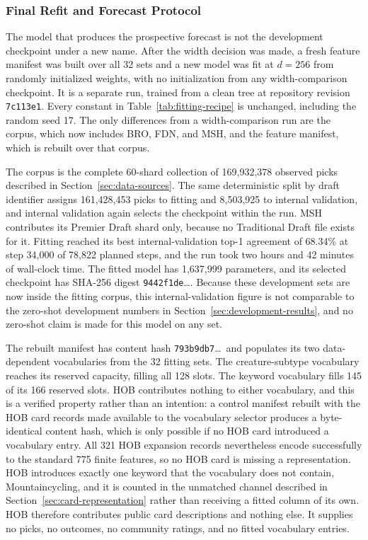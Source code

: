 \documentclass[11pt]{article}
\numberwithin{equation}{section}
\begin{document}
\subsubsection{Final Refit and Forecast Protocol}
\label{sec:final-refit-protocol}

The model that produces the prospective forecast is not the development
checkpoint under a new name. After the width decision was made, a fresh feature
manifest was built over all 32 sets and a new model was fit at $d=256$ from
randomly initialized weights, with no initialization from any width-comparison
checkpoint. It is a separate run, trained from a clean tree at
repository revision \texttt{7c113e1}. Every constant in
Table~\ref{tab:fitting-recipe} is unchanged, including the random seed 17. The
only differences from a width-comparison run are the corpus, which now includes
BRO, FDN, and MSH, and the feature manifest, which is rebuilt over that corpus.

The corpus is the complete 60-shard collection of 169,932,378 observed picks
described in Section~\ref{sec:data-sources}. The same deterministic split by
draft identifier assigns 161,428,453 picks to fitting and 8,503,925 to internal
validation, and internal validation again selects the checkpoint within the run.
MSH contributes its Premier Draft shard only, because no Traditional Draft file
exists for it. Fitting reached its best internal-validation top-1 agreement of
68.34\% at step 34,000 of 78,822 planned steps, and the run took two hours and
42 minutes of wall-clock time. The fitted model has 1,637,999 parameters, and
its selected checkpoint has SHA-256 digest
\texttt{9442f1de}\ldots. Because these development sets are now inside the
fitting corpus, this internal-validation figure is not comparable to the
zero-shot development numbers in Section~\ref{sec:development-results}, and no
zero-shot claim is made for this model on any set.

The rebuilt manifest has content hash \texttt{793b9db7}\ldots\ and populates its
two data-dependent vocabularies from the 32 fitting sets. The creature-subtype
vocabulary reaches its reserved capacity, filling all 128 slots. The keyword
vocabulary fills 145 of its 166 reserved slots. HOB contributes nothing to
either vocabulary, and this is a verified property rather than an intention: a
control manifest rebuilt with the HOB card records made available to the
vocabulary selector produces a byte-identical content hash, which is only
possible if no HOB card introduced a vocabulary entry. All 321 HOB expansion
records nevertheless encode successfully to the standard 775 finite features, so
no HOB card is missing a representation. HOB introduces exactly one keyword that
the vocabulary does not contain, Mountaincycling, and it is counted in the
unmatched channel described in Section~\ref{sec:card-representation} rather than
receiving a fitted column of its own. HOB therefore contributes public card
descriptions and nothing else. It supplies no picks, no outcomes, no community
ratings, and no fitted vocabulary entries.
\end{document}
